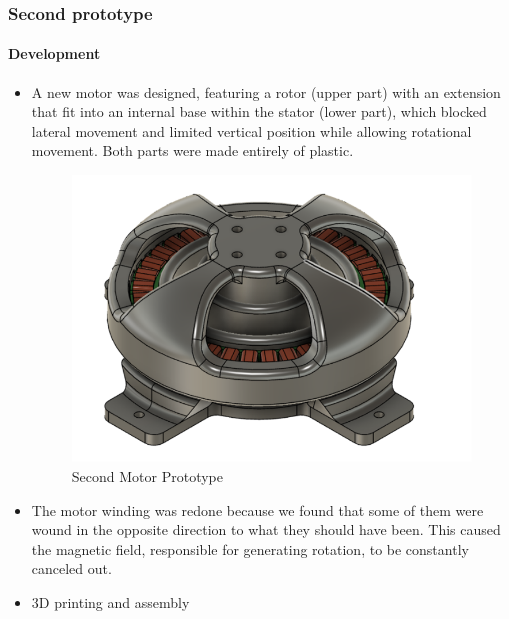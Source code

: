 \documentclass{article}
\begin{document}
\subsubsection{Second prototype}
\paragraph[short]{Development}
\begin{itemize}
    \item A new motor was designed, featuring a rotor (upper part) with an extension that fit into an internal base within the stator (lower part), 
    which blocked lateral movement and limited vertical position while allowing rotational movement. Both parts were made entirely of plastic.
    \begin{figure}[H]
        \centering
        \includegraphics[width=\linewidth]{Images/Motor/SegundoPrototipo.png}
        \caption{Second Motor Prototype}
    \end{figure}
    \item The motor winding was redone because we found that some of them were wound in the opposite direction to what they should have been. 
    This caused the magnetic field, responsible for generating rotation, to be constantly canceled out.

    \item 3D printing and assembly
\end{itemize}
\end{document}
